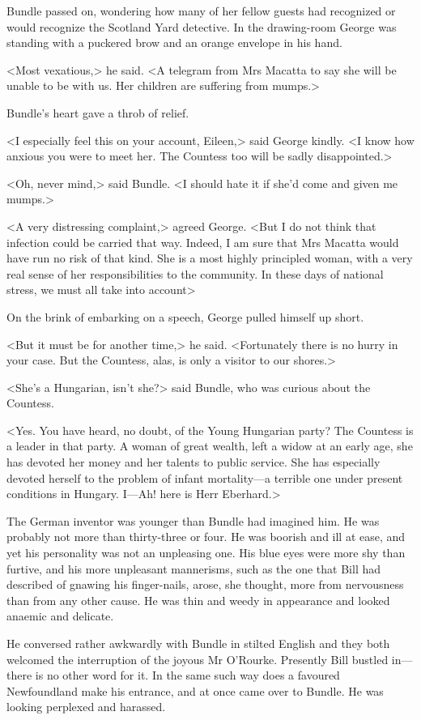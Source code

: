 Bundle passed on, wondering how many of her fellow guests had recognized or would recognize the Scotland Yard detective. In the drawing-room George was standing with a puckered brow and an orange envelope in his hand.

<Most vexatious,> he said. <A telegram from Mrs Macatta to say she will be unable to be with us. Her children are suffering from mumps.>

Bundle's heart gave a throb of relief.

<I especially feel this on your account, Eileen,> said George kindly. <I know how anxious you were to meet her. The Countess too will be sadly disappointed.>

<Oh, never mind,> said Bundle. <I should hate it if she'd come and given me mumps.>

<A very distressing complaint,> agreed George. <But I do not think that infection could be carried that way. Indeed, I am sure that Mrs Macatta would have run no risk of that kind. She is a most highly principled woman, with a very real sense of her responsibilities to the community. In these days of national stress, we must all take into account\longdash>

On the brink of embarking on a speech, George pulled himself up short.

<But it must be for another time,> he said. <Fortunately there is no hurry in your case. But the Countess, alas, is only a visitor to our shores.>

<She's a Hungarian, isn't she?> said Bundle, who was curious about the Countess.

<Yes. You have heard, no doubt, of the Young Hungarian party? The Countess is a leader in that party. A woman of great wealth, left a widow at an early age, she has devoted her money and her talents to public service. She has especially devoted herself to the problem of infant mortality—a terrible one under present conditions in Hungary. I—Ah! here is Herr Eberhard.>

The German inventor was younger than Bundle had imagined him. He was probably not more than thirty-three or four. He was boorish and ill at ease, and yet his personality was not an unpleasing one. His blue eyes were more shy than furtive, and his more unpleasant mannerisms, such as the one that Bill had described of gnawing his finger-nails, arose, she thought, more from nervousness than from any other cause. He was thin and weedy in appearance and looked anaemic and delicate.

He conversed rather awkwardly with Bundle in stilted English and they both welcomed the interruption of the joyous Mr O'Rourke. Presently Bill bustled in—there is no other word for it. In the same such way does a favoured Newfoundland make his entrance, and at once came over to Bundle. He was looking perplexed and harassed.

